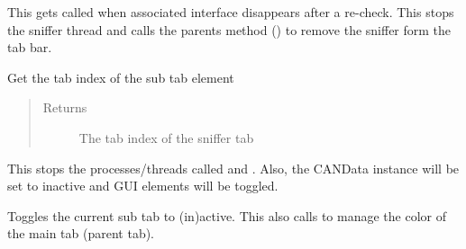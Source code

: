 \documentclass[letterpaper,10pt,english]{sphinxmanual}
\begin{document}
\begin{fulllineitems}
\begin{fulllineitems}
\label{\detokenize{src:src.SnifferTabElement.SnifferTabElement.removeSniffer}}
This gets called when associated interface disappears after a re-check.
This stops the sniffer thread and calls the parents method ()
to remove the sniffer form the tab bar.

\end{fulllineitems}


\begin{fulllineitems}
\label{\detokenize{src:src.SnifferTabElement.SnifferTabElement.tabIndex}}
Get the  tab index of the sub tab element
\begin{quote}\begin{description}
\item[{Returns}] \leavevmode
The tab index of the sniffer tab

\end{description}\end{quote}

\end{fulllineitems}


\begin{fulllineitems}
\label{\detokenize{src:src.SnifferTabElement.SnifferTabElement.terminateThreads}}
This stops the processes/threads called  and .
Also, the CANData instance will be set to inactive and GUI elements will be toggled.

\end{fulllineitems}


\begin{fulllineitems}
\label{\detokenize{src:src.SnifferTabElement.SnifferTabElement.toggleActive}}
Toggles the current sub tab to (in)active. This also calls {\hyperref[\detokenize{src:src.SnifferTab.SnifferTab.toggleActive}]{}} to manage
the color of the main tab (parent tab).


\end{fulllineitems}
\end{fulllineitems}
\end{document}
